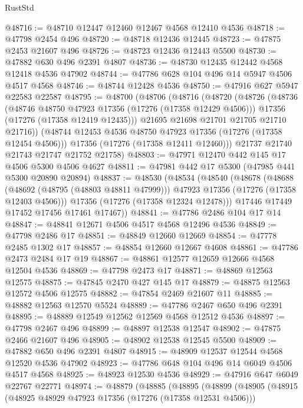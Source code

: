 \begin{lexlean}{RustStd}
\begin{coremodule}
@48716 := @48710 @12447 @12460 @12467 @4568 @12410 @4536
@48718 := @47798 @2454 @496
@48720 := @48718 @12436 @12445
@48723 := @47875 @2453 @21607 @496
@48726 := @48723 @12436 @12443 @5500
@48730 := @47882 @630 @496 @2391 @4807
@48736 := @48730 @12435 @12442 @4568 @12418 @4536 @47902
@48744 := @47786 @628 @104 @496 @14 @5947 @4506 @4517 @4568
@48746 := @48744 @12428 @4536
@48750 := @47916 @627 @5947 @22583 @22587
@48795 := @48700
    (@48706
      (@48716
        (@48720
          (@48726
            (@48736
              (@48746 @48750 @47923 @17356 (@17276 (@17358 @12429 @4506)))
              @17356
              (@17276 (@17358 @12419 @12435)))
            @21695
            @21698
            @21701
            @21705
            @21710
            @21716))
        (@48744 @12453 @4536 @48750 @47923 @17356 (@17276 (@17358 @12454 @4506)))
        @17356
        (@17276 (@17358 @12411 @12460)))
      @21737
      @21740
      @21743
      @21747
      @21752
      @21758)
@48803 := @47971 @12470 @442 @145 @17 @4506 @5300 @4506 @4627
@48811 := @47981 @442 @17 @5300 (@47985 @441 @5300 @20890 @20894)
@48837 := @48530
    (@48534
      (@48540
        (@48678
          (@48688
            (@48692 (@48795 (@48803 @48811 @47999)))
            @47923
            @17356
            (@17276 (@17358 @12403 @4506)))
          @17356
          (@17276 (@17358 @12324 @12478)))
        @17446
        @17449
        @17452
        @17456
        @17461
        @17467))
@48841 := @47786 @2486 @104 @17 @14
@48847 := @48841 @12671 @4506 @4517 @4568 @12496 @4536
@48849 := @47798 @2486 @17
@48851 := @48849 @12660 @12669
@48854 := @47778 @2485 @1302 @17
@48857 := @48854 @12660 @12667 @4608
@48861 := @47786 @2473 @2484 @17 @19
@48867 := @48861 @12577 @12659 @12666 @4568 @12504 @4536
@48869 := @47798 @2473 @17
@48871 := @48869 @12563 @12575
@48875 := @47845 @2470 @427 @145 @17
@48879 := @48875 @12563 @12572 @4506 @12575
@48882 := @47854 @2469 @21607 @11
@48885 := @48882 @12563 @12570 @5524
@48889 := @47786 @2467 @650 @496 @2391
@48895 := @48889 @12549 @12562 @12569 @4568 @12512 @4536
@48897 := @47798 @2467 @496
@48899 := @48897 @12538 @12547
@48902 := @47875 @2466 @21607 @496
@48905 := @48902 @12538 @12545 @5500
@48909 := @47882 @650 @496 @2391 @4807
@48915 := @48909 @12537 @12544 @4568 @12520 @4536 @47902
@48923 := @47786 @648 @104 @496 @14 @6049 @4506 @4517 @4568
@48925 := @48923 @12530 @4536
@48929 := @47916 @647 @6049 @22767 @22771
@48974 := @48879
    (@48885
      (@48895
        (@48899
          (@48905
            (@48915
              (@48925 @48929 @47923 @17356 (@17276 (@17358 @12531 @4506)))

\end{coremodule}
\end{lexlean}
